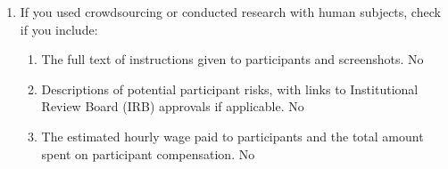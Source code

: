 \documentclass[twoside]{article}
\begin{document}
\begin{enumerate}
  \item If you used crowdsourcing or conducted research with human subjects, check if you include:
  \begin{enumerate}
    \item The full text of instructions given to participants and screenshots. No
    \item Descriptions of potential participant risks, with links to Institutional Review Board (IRB) approvals if applicable. No
    \item The estimated hourly wage paid to participants and the total amount spent on participant compensation. No
  \end{enumerate}

\end{enumerate}



\clearpage
\appendix
\thispagestyle{empty}
\end{document}
